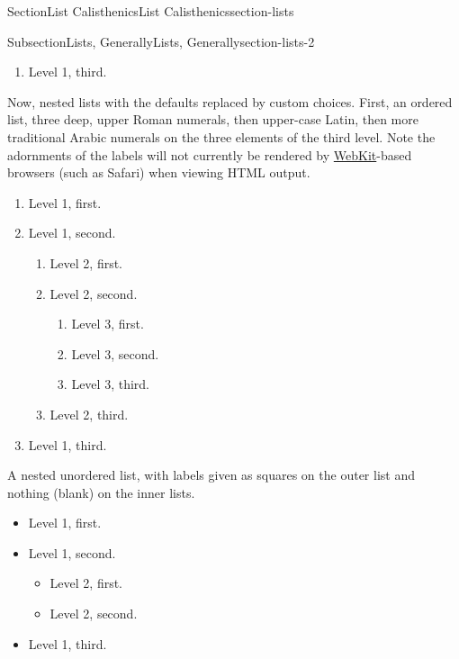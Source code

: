 \documentclass[twoside,10pt,]{article}
\numberwithin{equation}{section}
\begin{document}
\begin{sectionptx}{Section}{List Calisthenics}{}{List Calisthenics}{}{}{section-lists}
\begin{subsectionptx}{Subsection}{Lists, Generally}{}{Lists, Generally}{}{}{section-lists-2}
\begin{enumerate}
\begin{enumerate}
\begin{itemize}[label=\textbullet]
\begin{enumerate}
\begin{enumerate}
\end{enumerate}
%
\item{}Level 4, third.%
\end{enumerate}
%
\item{}Level 3, third.%
\end{itemize}
%
\item{}Level 2, third.%
\end{enumerate}
%
\item{}Level 1, third.%
\end{enumerate}
%
\par
Now, nested lists with the defaults replaced by custom choices.  First, an ordered list, three deep, upper Roman numerals, then upper-case Latin, then more traditional Arabic numerals on the three elements of the third level.  Note the adornments of the labels will not currently be rendered by \href{https://en.wikipedia.org/wiki/WebKit}{WebKit}-based browsers (such as Safari) when viewing HTML output.%
\begin{enumerate}[label={*\Roman**}]
\item{}Level 1, first.%
\item{}Level 1, second.%
\begin{enumerate}[label={++\Alph*}]
\item{}Level 2, first.%
\item{}Level 2, second.%
\begin{enumerate}[label={\arabic*)}]
\item{}Level 3, first.%
\item{}Level 3, second.%
\item{}Level 3, third.%
\end{enumerate}
%
\item{}Level 2, third.%
\end{enumerate}
%
\item{}Level 1, third.%
\end{enumerate}
%
\par
A nested unordered list, with labels given as squares on the outer list and nothing (blank) on the inner lists.%
\begin{itemize}[label=$\blacksquare$]
\item{}Level 1, first.%
\item{}Level 1, second.%
\begin{itemize}[label=]
\item{}Level 2, first.%
\item{}Level 2, second.%
\end{itemize}
%
\item{}Level 1, third.%

\end{itemize}
\end{subsectionptx}
\end{sectionptx}
\end{document}
